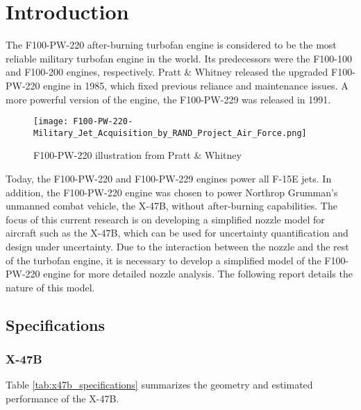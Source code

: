 \documentclass{article}
\begin{document}
\section{Introduction}

The F100-PW-220 after-burning turbofan engine is considered to be the most reliable military turbofan engine in the world. Its predecessors were the F100-100 and F100-200 engines, respectively. Pratt \& Whitney released the upgraded F100-PW-220 engine in 1985, which fixed previous reliance and maintenance issues. A more powerful version of the engine, the F100-PW-229 was released in 1991.

\begin{figure}
\caption{F100-PW-220 illustration from Pratt \& Whitney}
\label{fig:engine_illustration}
\begin{center}
\texttt{[image: F100-PW-220-Military\_Jet\_Acquisition\_by\_RAND\_Project\_Air\_Force.png]}
\end{center}
\end{figure}

Today, the F100-PW-220 and F100-PW-229 engines power all F-15E jets. In addition, the F100-PW-220 engine was chosen to power Northrop Grumman's unmanned combat vehicle, the X-47B, without after-burning capabilities. The focus of this current research is on developing a simplified nozzle model for aircraft such as the X-47B, which can be used for uncertainty quantification and design under uncertainty. Due to the interaction between the nozzle and the rest of the turbofan engine, it is necessary to develop a simplified model of the F100-PW-220 engine for more detailed nozzle analysis. The following report details the nature of this model.

\subsection{Specifications}

\subsubsection{X-47B}
Table \ref{tab:x47b_specifications} summarizes the geometry and estimated performance of the X-47B.
\end{document}
